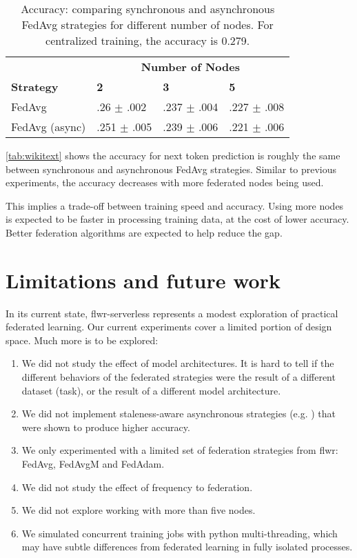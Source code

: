 \documentclass[twocolumn, switch]{article} %
\begin{document}
\begin{table}[H]
\begin{center}
\begin{tabular}{l|lll}
\toprule
    & \multicolumn{3}{c}{\textbf{Number of Nodes}} \\
    \textbf{Strategy} & \textbf{2} & \textbf{3} & \textbf{5}  \\
    \midrule
    
    FedAvg & .26 $\pm$ .002 & .237 $\pm$ .004 & .227 $\pm$ .008 \\
    FedAvg (async) & .251 $\pm$ .005 & .239 $\pm$ .006 & .221 $\pm$ .006 \\
    \bottomrule
\end{tabular}
   \vspace{5pt}
\caption{Accuracy: comparing synchronous and asynchronous FedAvg strategies for different number of nodes. For centralized training, the accuracy is 0.279.}
\label{tab:wikitext}
\end{center}
\end{table}

\autoref{tab:wikitext} shows the accuracy for next token prediction is roughly the same between synchronous and asynchronous FedAvg strategies. Similar to previous experiments, the accuracy decreases with more federated nodes being used. 

This implies a trade-off between training speed and accuracy. Using more nodes is expected to be faster in processing training data, at the cost of lower accuracy. Better federation algorithms are expected to help reduce the gap.

\section{Limitations and future work}

In its current state, \textrm{flwr-serverless} represents a modest exploration of practical federated learning. Our current experiments cover a limited portion of design space. Much more is to be explored:

\begin{enumerate}
    \item We did not study the effect of model architectures. It is hard to tell if the different behaviors of the federated strategies were the result of a different dataset (task), or the result of a different model architecture.
    \item We did not implement staleness-aware asynchronous strategies (e.g. \cite{buffered-async}) that were shown to produce higher accuracy.
    \item We only experimented with a limited set of federation strategies from flwr: FedAvg, FedAvgM and FedAdam. 
    \item We did not study the effect of frequency to federation.
    \item We did not explore working with more than five nodes.
    \item We simulated concurrent training jobs with python multi-threading, which may have subtle differences from federated learning in fully isolated processes.
\end{enumerate}
\end{document}
